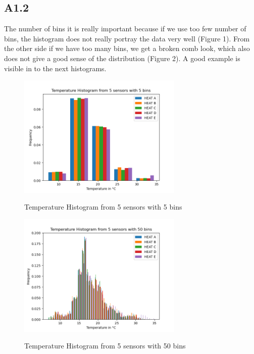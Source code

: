 \documentclass[a4paper,12pt]{article}
\begin{document}
 \subsection{A1.2}
The number of bins it is really important because if we use too few number of bins, the histogram does not really portray the data very well (Figure 1). From the other side if we have too many bins, we get a broken comb look, which also does not give a good sense of the distribution (Figure 2). A good example is visible in to the next histograms.
  \begin{figure}[H] 
	\centering
	\includegraphics[width=0.7\textwidth]{Temperature Histogram from 5 sensors with 5 bins.png}
	\caption{Temperature Histogram from 5 sensors with 5 bins}\cite{Maiullari2020}
  \end{figure}
  \begin{figure}[H] 
	\centering
	\includegraphics[width=0.7\textwidth]{Temperature Histogram from 5 sensors with 50 bins.png}
	\caption{Temperature Histogram from 5 sensors with 50 bins}\cite{Maiullari2020}
  \end{figure}
\end{document}
